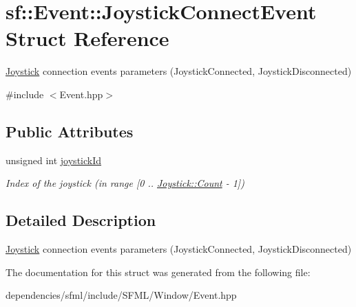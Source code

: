 \hypertarget{structsf_1_1_event_1_1_joystick_connect_event}{}\section{sf\+:\+:Event\+:\+:Joystick\+Connect\+Event Struct Reference}
\label{structsf_1_1_event_1_1_joystick_connect_event}


\hyperlink{classsf_1_1_joystick}{Joystick} connection events parameters (Joystick\+Connected, Joystick\+Disconnected)  




{\ttfamily \#include $<$Event.\+hpp$>$}

\subsection*{Public Attributes}
\begin{DoxyCompactItemize}
\item 
\mbox{\label{structsf_1_1_event_1_1_joystick_connect_event_a08e58e8559d3e4fe4654855fec79194b}} 
unsigned int \hyperlink{structsf_1_1_event_1_1_joystick_connect_event_a08e58e8559d3e4fe4654855fec79194b}{joystick\+Id}
\begin{DoxyCompactList}\small\item\em Index of the joystick (in range \mbox{[}0 .. \hyperlink{classsf_1_1_joystick_afeddb38b35ca6be2310127d75c2d7e7aa6e0a2a95bc1da277610c04d80f52715e}{Joystick\+::\+Count} -\/ 1\mbox{]}) \end{DoxyCompactList}\end{DoxyCompactItemize}


\subsection{Detailed Description}
\hyperlink{classsf_1_1_joystick}{Joystick} connection events parameters (Joystick\+Connected, Joystick\+Disconnected) 

The documentation for this struct was generated from the following file\+:\begin{DoxyCompactItemize}
\item 
dependencies/sfml/include/\+S\+F\+M\+L/\+Window/Event.\+hpp\end{DoxyCompactItemize}
